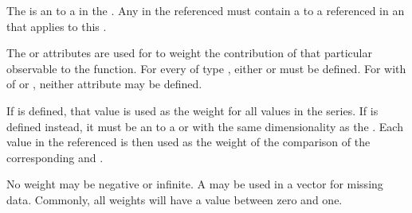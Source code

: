 The  is an \SIdRef to a \DataGenerator in the \SedDocument.  Any \Variable in the referenced \DataGenerator must contain a  to a \Model referenced in an \AdjustableParameter that applies to this \FitExperiment.

The  or  attributes are used for  \FitMappings to weight the contribution of that particular observable to the \Objective function.  For every \FitMapping of type , either  or  must be defined.  For \FitMappings with  of  or , neither attribute may be defined.

If  is defined, that value is used as the weight for all values in the series.  If  is defined instead, it must be an \SIdRef to a \DataGenerator or \DataSource with the same dimensionality as the .  Each value in the referenced  is then used as the weight of the comparison of the corresponding  and .

No weight may be negative or infinite.  A  may be used in a  vector for missing data.  Commonly, all weights will have a value between zero and one.


